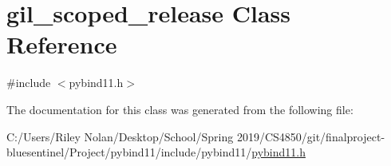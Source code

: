 \hypertarget{classgil__scoped__release}{}\section{gil\+\_\+scoped\+\_\+release Class Reference}
\label{classgil__scoped__release}


{\ttfamily \#include $<$pybind11.\+h$>$}



The documentation for this class was generated from the following file\+:\begin{DoxyCompactItemize}
\item 
C\+:/\+Users/\+Riley Nolan/\+Desktop/\+School/\+Spring 2019/\+C\+S4850/git/finalproject-\/bluesentinel/\+Project/pybind11/include/pybind11/\mbox{\hyperlink{pybind11_8h}{pybind11.\+h}}\end{DoxyCompactItemize}
